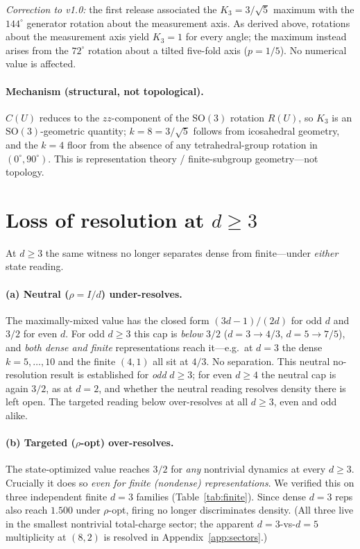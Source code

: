 \documentclass[aps,prx,reprint,amsmath,amssymb,floatfix,nofootinbib,superscriptaddress]{revtex4-2}
\begin{document}
\emph{Correction to v1.0:} the first release associated the $K_3 = 3/\sqrt{5}$
maximum with the $144^\circ$ generator rotation about the measurement axis. As
derived above, rotations about the measurement axis yield $K_3 = 1$ for every
angle; the maximum instead arises from the $72^\circ$ rotation about a tilted
five-fold axis ($p = 1/5$). No numerical value is affected.

\paragraph{Mechanism (structural, not topological).}
$C(U)$ reduces to the $zz$-component of the $\mathrm{SO}(3)$ rotation $R(U)$, so $K_3$
is an $\mathrm{SO}(3)$-geometric quantity; $k=8 = 3/\sqrt5$ follows from icosahedral
geometry, and the $k=4$ floor from the absence of any tetrahedral-group rotation in
$(0^\circ, 90^\circ)$. This is representation theory / finite-subgroup geometry---not
topology.

\section{Loss of resolution at $d \ge 3$}
\label{sec:d3}

At $d \ge 3$ the same witness no longer separates dense from finite---under
\emph{either} state reading.

\paragraph{(a) Neutral ($\rho = I/d$) under-resolves.}
The maximally-mixed value has the closed form $(3d-1)/(2d)$ for odd $d$ and $3/2$ for
even $d$. For odd $d \ge 3$ this cap is \emph{below} $3/2$ ($d=3 \to 4/3$,
$d=5 \to 7/5$), and \emph{both dense and finite} representations reach it---e.g.\ at
$d=3$ the dense $k = 5,\ldots,10$ and the finite $(4,1)$ all sit at $4/3$. No
separation. This neutral no-resolution result is established for
\emph{odd} $d \ge 3$; for even $d \ge 4$ the neutral cap is again
$3/2$, as at $d=2$, and whether the neutral reading resolves density
there is left open. The targeted reading below over-resolves at all
$d \ge 3$, even and odd alike.

\paragraph{(b) Targeted ($\rho$-opt) over-resolves.}
The state-optimized value reaches $3/2$ for \emph{any} nontrivial dynamics at every
$d \ge 3$. Crucially it does so \emph{even for finite (nondense) representations}. We
verified this on three independent finite $d=3$ families (Table~\ref{tab:finite}).
Since dense $d=3$ reps also reach $1.500$ under $\rho$-opt, firing no longer
discriminates density. (All three live in the smallest nontrivial total-charge
sector; the apparent $d=3$-vs-$d=5$ multiplicity at $(8,2)$ is resolved in
Appendix~\ref{app:sectors}.)
\end{document}
